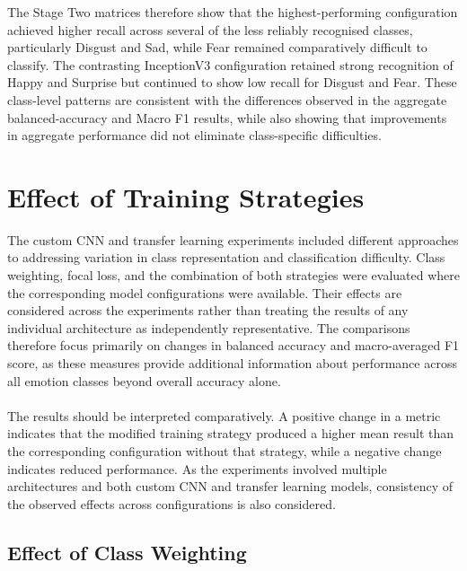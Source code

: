 \documentclass[12pt, a4paper]{report}
\let\oldsection\section
\renewcommand{\section}{%
    \Needspace{6\baselineskip}%
    \oldsection
}
\let\oldsubsection\subsection
\renewcommand{\subsection}{%
    \Needspace{6\baselineskip}%
    \oldsubsection
}
\begin{document}
					The Stage Two matrices therefore show that the highest-performing configuration achieved higher recall across several of the less reliably recognised classes, particularly Disgust and Sad, while Fear remained comparatively difficult to classify. The contrasting InceptionV3 configuration retained strong recognition of Happy and Surprise but continued to show low recall for Disgust and Fear. These class-level patterns are consistent with the differences observed in the aggregate balanced-accuracy and Macro F1 results, while also showing that improvements in aggregate performance did not eliminate class-specific difficulties.
					
		\newpage
		\section{Effect of Training Strategies}
			
			The custom CNN and transfer learning experiments included different approaches to addressing variation in class representation and classification difficulty. Class weighting, focal loss, and the combination of both strategies were evaluated where the corresponding model configurations were available. Their effects are considered across the experiments rather than treating the results of any individual architecture as independently representative. The comparisons therefore focus primarily on changes in balanced accuracy and macro-averaged F1 score, as these measures provide additional information about performance across all emotion classes beyond overall accuracy alone.\\\\
			The results should be interpreted comparatively. A positive change in a metric indicates that the modified training strategy produced a higher mean result than the corresponding configuration without that strategy, while a negative change indicates reduced performance. As the experiments involved multiple architectures and both custom CNN and transfer learning models, consistency of the observed effects across configurations is also considered.
			
			\subsection{Effect of Class Weighting}
				
\end{document}
